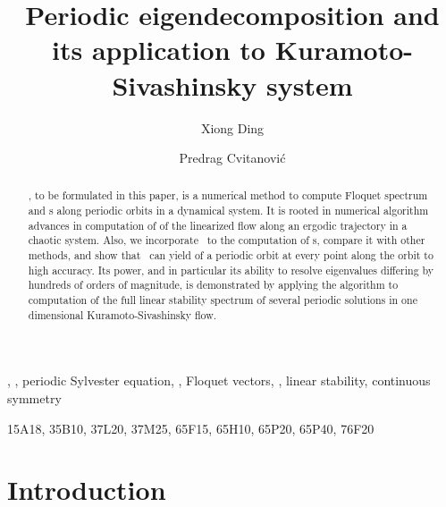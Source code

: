 \documentclass[final,leqno,onefignum,onetabnum]{siamltexmm}
\title{
Periodic eigendecomposition and its application to
Kuramoto-Sivashinsky system
}
\author{
  Xiong Ding\footnotemark[2]
  \and
  Predrag Cvitanovi\'{c}\footnotemark[2]
}
\begin{document}
\maketitle
\newcommand{\slugmaster}{%
\slugger{siads}{xxxx}{xx}{x}{x--x}}

\renewcommand{\thefootnote}{\fnsymbol{footnote}}

\begin{abstract}
\Ped, to be formulated in this paper,
is a numerical method to compute Floquet spectrum and \Fv s along
periodic orbits in a dynamical system. It is rooted in
numerical algorithm advances in computation
of \edit{\cLvs}
of the linearized flow along an ergodic trajectory in a chaotic
system. Also, we incorporate \psd\ to the computation of
\Fv s, compare it with other
methods, and show that \ped\ can yield
of a periodic orbit at every point along the orbit to high accuracy.
Its power, and in particular its ability to resolve eigenvalues
differing by hundreds of orders of magnitude, is demonstrated by
applying the algorithm to computation of the full linear stability
spectrum of several periodic solutions in one dimensional
Kuramoto-Sivashinsky flow.
\end{abstract}

\begin{keywords}
\ped, \psd, periodic Sylvester equation,
\edit{\cLvs}, Floquet
vectors, \KS, linear stability, continuous symmetry
\end{keywords}

\begin{AMS}
  15A18, 35B10, 37L20, 37M25, 65F15, 65H10, 65P20, 65P40, 76F20
\end{AMS}
\pagestyle{myheadings}
\thispagestyle{plain}

\section{Introduction}
\label{sect:intro}
\end{document}
